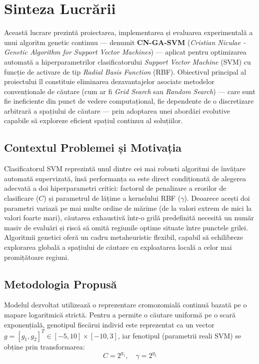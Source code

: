 \documentclass[12pt,a4paper]{report}
\begin{document}
\justifying
\setlength{\parindent}{1.5cm}

\tableofcontents
\newpage
\chapter*{Sinteza Lucrării}

Această lucrare prezintă proiectarea, implementarea și evaluarea experimentală a unui algoritm genetic continuu — denumit \textbf{CN-GA-SVM} (\textit{Cristian Niculae - Genetic Algorithm for Support Vector Machines}) — aplicat pentru optimizarea automată a hiperparametrilor clasificatorului \textit{Support Vector Machine} (SVM) cu funcție de activare de tip \textit{Radial Basis Function} (RBF). Obiectivul principal al proiectului îl constituie eliminarea dezavantajelor asociate metodelor convenționale de căutare (cum ar fi \textit{Grid Search} sau \textit{Random Search}) — care sunt fie ineficiente din punct de vedere computațional, fie dependente de o discretizare arbitrară a spațiului de căutare — prin adoptarea unei abordări evolutive capabile să exploreze eficient spațiul continuu al soluțiilor.

\section*{Contextul Problemei și Motivația}
Clasificatorul SVM reprezintă unul dintre cei mai robusti algoritmi de învățare automată supervizată, însă performanța sa este direct condiționată de alegerea adecvată a doi hiperparametri critici: factorul de penalizare a erorilor de clasificare ($C$) și parametrul de lățime a kernelului RBF ($\gamma$). Deoarece acești doi parametri variază pe mai multe ordine de mărime (de la valori extrem de mici la valori foarte mari), căutarea exhaustivă într-o grilă predefinită necesită un număr masiv de evaluări și riscă să omită regiunile optime situate între punctele grilei. Algoritmii genetici oferă un cadru metaheuristic flexibil, capabil să echilibreze explorarea globală a spațiului de căutare cu exploatarea locală a celor mai promițătoare regiuni.

\section*{Metodologia Propusă}
Modelul dezvoltat utilizează o reprezentare cromozomială continuă bazată pe o mapare logaritmică strictă. Pentru a permite o căutare uniformă pe o scară exponențială, genotipul fiecărui individ este reprezentat ca un vector $g = [g_1, g_2]^T \in [-5, 10] \times [-10, 3]$, iar fenotipul (parametrii reali SVM) se obține prin transformarea:
\begin{equation*}
C = 2^{g_1}, \quad \gamma = 2^{g_2}
\end{equation*}
\end{document}
